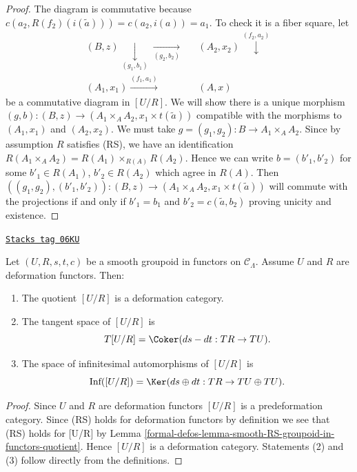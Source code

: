 \begin{proof}
\medskip\noindent
The diagram is commutative because
$c(a_2, R(f_2)(i(\widetilde{a}))) = c(a_2, i(a)) = a_1$.
To check it is a fiber square, let
$$
\begin{array}{ccc}(B, z) \underset{(g_1, b_1)}{\downarrow}\underset{(g_2, b_2)}{\longrightarrow} &  & (A_2, x_2)
\overset{(f_2, a_2)}{\downarrow} \\ (A_1, x_1) \overset{(f_1, a_1)}{\longrightarrow} &  & (A, x)\end{array}
$$
be a commutative diagram in $[U/R]$. We will show there is a unique morphism
$(g, b) : (B, z) \to (A_1 \times_A A_2, x_1 \times t(\widetilde{a}))$
compatible with the morphisms to $(A_1, x_1)$ and $(A_2, x_2)$.
We must take $g = (g_1, g_2) : B \to A_1 \times_A A_2$.
Since by assumption $R$ satisfies (RS), we have an identification
$R(A_1 \times_A A_2) = R(A_1) \times_{R(A)} R(A_2)$.
Hence we can write $b = (b'_1, b'_2)$ for some
$b'_1 \in R(A_1)$, $b'_2 \in R(A_2)$ which agree in $R(A)$.
Then
$((g_1, g_2), (b'_1, b'_2)) : (B, z) \to
(A_1 \times_A A_2, x_1 \times t(\widetilde{a}))$
will commute with the projections if and only if
$b'_1 = b_1$ and $b'_2 = c(\widetilde{a}, b_2)$ proving unicity and
existence.
\end{proof}

\begin{lemma}
\label{formal-defos-lemma-deformation-groupoid-quotient}
\href{https://stacks.math.columbia.edu/tag/06KU}{\texttt{Stacks tag 06KU}}

Let $(U, R, s, t, c)$ be a smooth groupoid in functors on $\mathcal{C}_\Lambda$.
Assume $U$ and $R$ are deformation functors. Then:
\begin{enumerate}
\item The quotient $[U/R]$ is a deformation category.
\item The tangent space of $[U/R]$ is
$$
T[U/R] = \Coker(ds-dt: TR \to TU).
$$
\item The space of infinitesimal automorphisms of $[U/R]$ is
$$
\text{Inf}([U/R]) =
\Ker(ds \oplus dt : TR \to TU \oplus TU).
$$
\end{enumerate}
\end{lemma}

\begin{proof}
Since $U$ and $R$ are deformation functors $[U/R]$ is a predeformation
category. Since (RS) holds for deformation functors by
definition we see that (RS) holds for [U/R] by
Lemma \ref{formal-defos-lemma-smooth-RS-groupoid-in-functors-quotient}.
Hence $[U/R]$ is a deformation category. Statements (2) and (3)
follow directly from the definitions.
\end{proof}

